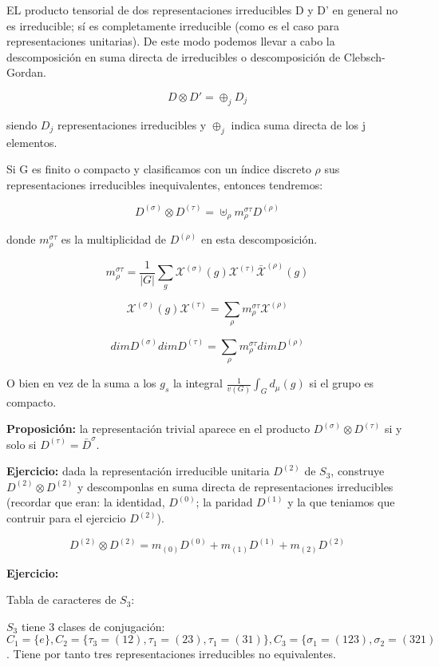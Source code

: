 \documentclass{article}
\begin{document}
EL producto tensorial de dos representaciones irreducibles D y D' en general no es irreducible; sí es completamente irreducible (como es el caso para representaciones unitarias). De este modo podemos llevar a cabo la descomposición en suma directa de irreducibles o descomposición de Clebsch-Gordan.

$$D\otimes D'=\oplus _j D_j$$

siendo $D_j$ representaciones irreducibles y $\oplus _j$ indica suma directa de los j elementos.

\smallskip
Si G es finito o compacto y clasificamos con un índice discreto $\rho$ sus representaciones irreducibles inequivalentes, entonces tendremos:

$$D^{(\sigma)}\otimes D^{(\tau)}=\uplus _\rho m_\rho ^{\sigma \tau} D^{(\rho)}$$

donde $m_\rho ^{\sigma \tau}$ es la multiplicidad de $D^{(\rho)}$ en esta descomposición.

$$m_\rho ^{\sigma \tau} =\frac{1}{|G|} \sum _g \mathcal{X}^{(\sigma)}(g)\mathcal{X}^{(\tau)}\bar{\mathcal{X}}^{(\rho)}(g)$$

$$\mathcal{X}^{(\sigma)}(g)\mathcal{X}^{(\tau)}= \sum _\rho m_\rho ^{\sigma \tau}\mathcal{X}^{(\rho)}$$

$$dimD^{(\sigma)}dim D^{(\tau)}=\sum _\rho m_\rho ^{\sigma \tau} dimD^{(\rho)}$$

O bien en vez de la suma a los $g_s$ la integral $\frac{1}{v(G)}\int _G d_\mu (g)$ si el grupo es compacto.

\smallskip
\textbf{Proposición:} la representación trivial aparece en el producto $D^{(\sigma)}\otimes D^{(\tau)}$ si y solo si $D^{(\tau)}= \bar{D}^{\sigma}$.

\smallskip
\textbf{Ejercicio:} dada la representación irreducible unitaria $D^{(2)}$ de $S_3$, construye $D^{(2)}\otimes D^{(2)}$ y descomponlas en suma directa de representaciones irreducibles (recordar que eran: la identidad, $D^{(0)}$; la paridad $D^{(1)}$ y la que teniamos que contruir para el ejercicio $D^{(2)}$).

$$D^{(2)}\otimes D^{(2)}=m_{(0)}D^{(0)}+m_{(1)}D^{(1)}+m_{(2)}D^{(2)}$$

\textbf{Ejercicio:}

    \smallskip
    Tabla de caracteres de $S_3$:

    \smallskip
    $S_3$ tiene 3 clases de conjugación: $C_1=\lbrace e \rbrace, C_2= \lbrace \tau _3=(12),\tau _1=(23), \tau _1=(31)\rbrace, C_3=\lbrace \sigma _1=(123),\sigma _2=(321)$. Tiene por tanto tres representaciones irreducibles no equivalentes.
\end{document}
